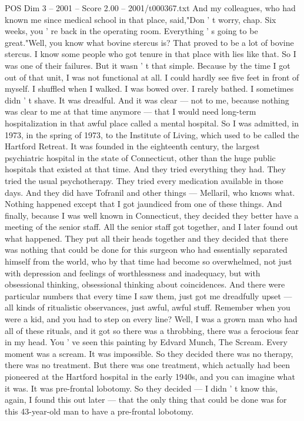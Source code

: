 \begin{textsample}{POS Dim 3 – 2001 – Score 2.00 – 2001/t000367.txt}
And my colleagues, who had known me since medical school in that place, said,"Don ' t worry, chap.
Six weeks, you ' re back in the operating room.
Everything ' s going to be great."Well, you know what bovine stercus is?
That proved to be a lot of bovine stercus.
I know some people who got tenure in that place with lies like that.
So I was one of their failures.
But it wasn ' t that simple.
Because by the time I got out of that unit, I was not functional at all.
I could hardly see five feet in front of myself.
I shuffled when I walked.
I was bowed over.
I rarely bathed.
I sometimes didn ' t shave.
It was dreadful.
And it was clear — not to me, because nothing was clear to me at that time anymore — that I would need long-term hospitalization in that awful place called a mental hospital.
So I was admitted, in 1973, in the spring of 1973, to the Institute of Living, which used to be called the Hartford Retreat.
It was founded in the eighteenth century, the largest psychiatric hospital in the state of Connecticut, other than the huge public hospitals that existed at that time.
And they tried everything they had.
They tried the usual psychotherapy.
They tried every medication available in those days.
And they did have Tofranil and other things — Mellaril, who knows what.
Nothing happened except that I got jaundiced from one of these things.
And finally, because I was well known in Connecticut, they decided they better have a meeting of the senior staff.
All the senior staff got together, and I later found out what happened.
They put all their heads together and they decided that there was nothing that could be done for this surgeon who had essentially separated himself from the world, who by that time had become so overwhelmed, not just with depression and feelings of worthlessness and inadequacy, but with obsessional thinking, obsessional thinking about coincidences.
And there were particular numbers that every time I saw them, just got me dreadfully upset — all kinds of ritualistic observances, just awful, awful stuff.
Remember when you were a kid, and you had to step on every line?
Well, I was a grown man who had all of these rituals, and it got so there was a throbbing, there was a ferocious fear in my head.
You ' ve seen this painting by Edvard Munch, The Scream.
Every moment was a scream.
It was impossible.
So they decided there was no therapy, there was no treatment.
But there was one treatment, which actually had been pioneered at the Hartford hospital in the early 1940s, and you can imagine what it was.
It was pre-frontal lobotomy.
So they decided — I didn ' t know this, again, I found this out later — that the only thing that could be done was for this 43-year-old man to have a pre-frontal lobotomy.

\end{textsample}
